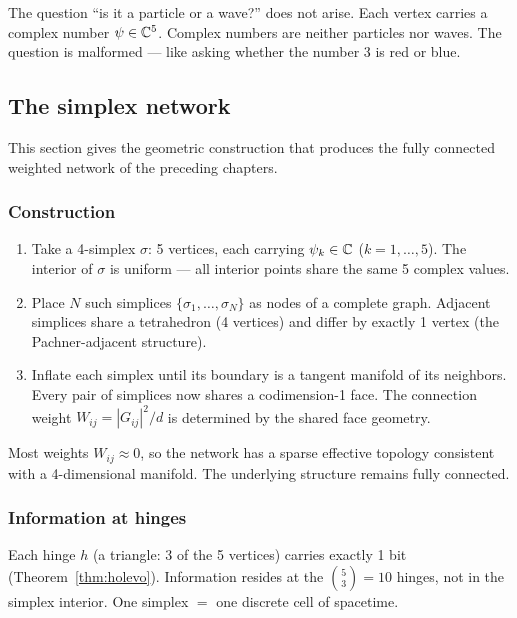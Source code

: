 The question ``is it a particle or a wave?'' does not arise. Each vertex carries a complex number $\psi \in \mathbb{C}^5$. Complex numbers are neither particles nor waves. The question is malformed --- like asking whether the number 3 is red or blue.

\subsection{The simplex network}

This section gives the geometric construction that produces the fully connected weighted network of the preceding chapters.

\subsubsection{Construction}

\begin{enumerate}
\item Take a 4-simplex $\sigma$: 5 vertices, each carrying $\psi_k \in \mathbb{C}$ ($k = 1, \ldots, 5$). The interior of $\sigma$ is uniform --- all interior points share the same 5 complex values.

\item Place $N$ such simplices $\{\sigma_1, \ldots, \sigma_N\}$ as nodes of a complete graph. Adjacent simplices share a tetrahedron (4 vertices) and differ by exactly 1 vertex (the Pachner-adjacent structure).

\item Inflate each simplex until its boundary is a tangent manifold of its neighbors. Every pair of simplices now shares a codimension-1 face. The connection weight $W_{ij} = |G_{ij}|^2/d$ is determined by the shared face geometry.
\end{enumerate}

Most weights $W_{ij} \approx 0$, so the network has a sparse effective topology consistent with a 4-dimensional manifold. The underlying structure remains fully connected.

\subsubsection{Information at hinges}

Each hinge $h$ (a triangle: 3 of the 5 vertices) carries exactly 1 bit (Theorem~\ref{thm:holevo}). Information resides at the $\binom{5}{3} = 10$ hinges, not in the simplex interior. One simplex $=$ one discrete cell of spacetime.


